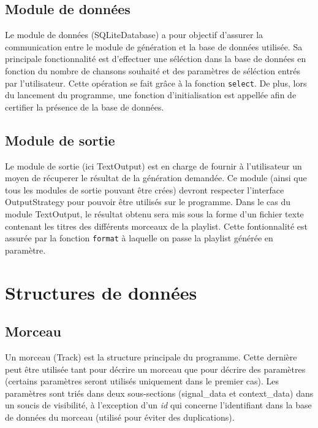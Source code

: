 \subsection{Module de données}
\label{archi:modules:donnees}

Le module de données (SQLiteDatabase) a pour objectif d'assurer la 
communication entre le module de génération et la base de données utilisée. 
Sa principale fonctionnalité est d'effectuer une séléction dans la base de 
données en fonction du nombre de chansons souhaité et des paramètres de 
séléction entrés par l'utilisateur. Cette opération se fait grâce à la 
fonction \texttt{select}. De plus, lors du lancement du programme, une 
fonction d'initialisation est appellée afin de certifier la présence de la 
base de données.

\subsection{Module de sortie}
\label{archi:modules:sortie}

Le module de sortie (ici TextOutput) est en charge de fournir à 
l'utilisateur un moyen de récuperer le résultat de la génération demandée. 
Ce module (ainsi que tous les modules de sortie pouvant être crées) devront 
respecter l'interface OutputStrategy pour pouvoir être utilisés sur le 
programme. Dans le cas du module TextOutput, le résultat obtenu sera mis 
sous la forme d'un fichier texte contenant les titres des différents 
morceaux de la playlist. Cette fontionnalité est assurée par la fonction 
\texttt{format} à laquelle on passe la playlist générée en paramètre.

\section{Structures de données}
\label{archi:structures}

\subsection{Morceau}
\label{archi:structures:morceau}

Un morceau (Track) est la structure principale du programme. Cette dernière 
peut être utilisée tant pour décrire un morceau que pour décrire des 
paramètres (certains paramètres seront utilisés uniquement dans le premier 
cas). Les paramètres sont triés dans deux sous-sections (signal\_data et 
context\_data) dans un soucis de visibilité, à l'exception d'un \textit{id} 
qui concerne l'identifiant dans la base de données du morceau (utilisé pour 
éviter des duplications).

